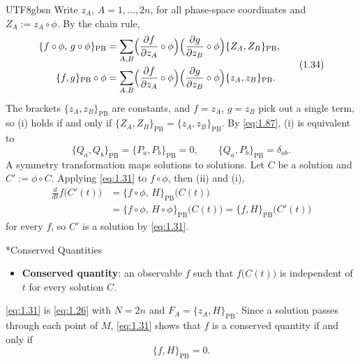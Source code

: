 \documentclass[11pt,a4paper,oneside]{report}
\makeatletter
\newcommand\topic{\@startsection{paragraph}{4}{\z@}{-1.7ex plus -.3ex}{.5ex}{\normalfont\normalsize\bfseries\itshape\boldmath}*}
\makeatother
\begin{document}
\begin{CJK*}{UTF8}{gbsn}
Write $z_A$, $A=1,\ldots,2n$, for all phase-space coordinates and $Z_A:=z_A\circ\phi$. By the chain rule,
\begin{equation*}
\begin{aligned}
\{f\circ\phi,\,g\circ\phi\}_{\mathrm{PB}}
&=\sum_{A,B}\Bigl(\frac{\partial f}{\partial z_A}\circ\phi\Bigr)\Bigl(\frac{\partial g}{\partial z_B}\circ\phi\Bigr)\{Z_A,Z_B\}_{\mathrm{PB}},\\
\{f,g\}_{\mathrm{PB}}\circ\phi
&=\sum_{A,B}\Bigl(\frac{\partial f}{\partial z_A}\circ\phi\Bigr)\Bigl(\frac{\partial g}{\partial z_B}\circ\phi\Bigr)\{z_A,z_B\}_{\mathrm{PB}}.
\end{aligned}
\tag{1.34}\label{eq:1.34}
\end{equation*}
The brackets $\{z_A,z_B\}_{\mathrm{PB}}$ are constants, and $f=z_A$, $g=z_B$ pick out a single term, so (i) holds if and only if $\{Z_A,Z_B\}_{\mathrm{PB}}=\{z_A,z_B\}_{\mathrm{PB}}$. By \eqref{eq:1.87}, (i) is equivalent to
\begin{equation*}
{\displaystyle 
\{Q_a,Q_b\}_{\mathrm{PB}}=\{P_a,P_b\}_{\mathrm{PB}}=0,\qquad
\{Q_a,P_b\}_{\mathrm{PB}}=\delta_{ab}.}
\tag{1.35}\label{eq:1.35}
\end{equation*}
A symmetry transformation maps solutions to solutions. Let $C$ be a solution and $C':=\phi\circ C$. Applying \eqref{eq:1.31} to $f\circ\phi$, then (ii) and (i),
\begin{equation*}
\begin{aligned}
\frac{d}{dt}f\bigl(C'(t)\bigr)
&=\{f\circ\phi,\,H\}_{\mathrm{PB}}\bigl(C(t)\bigr)\\
&=\{f\circ\phi,\,H\circ\phi\}_{\mathrm{PB}}\bigl(C(t)\bigr)
=\{f,H\}_{\mathrm{PB}}\bigl(C'(t)\bigr)
\end{aligned}
\tag{1.36}\label{eq:1.36}
\end{equation*}
for every $f$, so $C'$ is a solution by \eqref{eq:1.31}.

\topic{Conserved Quantities}
\begin{itemize}


\item \textbf{\boldmath Conserved quantity}: an observable $f$ such that $f\bigl(C(t)\bigr)$ is independent of $t$ for every solution $C$.
\end{itemize}


\eqref{eq:1.31} is \eqref{eq:1.26} with $N=2n$ and $F_A=\{z_A,H\}_{\mathrm{PB}}$. Since a solution passes through each point of $M$, \eqref{eq:1.31} shows that $f$ is a conserved quantity if and only if
\begin{equation*}
{\displaystyle \{f,H\}_{\mathrm{PB}}=0.}
\tag{1.37}\label{eq:1.37}
\end{equation*}


\end{CJK*}
\end{document}
